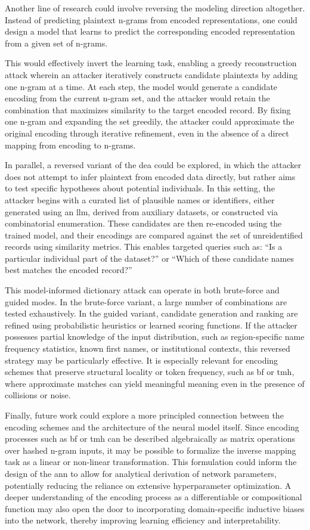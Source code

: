 Another line of research could involve reversing the modeling direction altogether.
Instead of predicting plaintext n-grams from encoded representations, one could design a model that learns to predict the corresponding encoded representation from a given set of n-grams.

This would effectively invert the learning task, enabling a greedy reconstruction attack wherein an attacker iteratively constructs candidate plaintexts by adding one n-gram at a time.
At each step, the model would generate a candidate encoding from the current n-gram set, and the attacker would retain the combination that maximizes similarity to the target encoded record.
By fixing one n-gram and expanding the set greedily, the attacker could approximate the original encoding through iterative refinement, even in the absence of a direct mapping from encoding to n-grams.

In parallel, a reversed variant of the \ac{dea} could be explored, in which the attacker does not attempt to infer plaintext from encoded data directly, but rather aims to test specific hypotheses about potential individuals.
In this setting, the attacker begins with a curated list of plausible names or identifiers, either generated using an \ac{llm}, derived from auxiliary datasets, or constructed via combinatorial enumeration.
These candidates are then re-encoded using the trained model, and their encodings are compared against the set of unreidentified records using similarity metrics.
This enables targeted queries such as: ``Is a particular individual part of the dataset?'' or ``Which of these candidate names best matches the encoded record?''

This model-informed dictionary attack can operate in both brute-force and guided modes.
In the brute-force variant, a large number of combinations are tested exhaustively.
In the guided variant, candidate generation and ranking are refined using probabilistic heuristics or learned scoring functions.
If the attacker possesses partial knowledge of the input distribution, such as region-specific name frequency statistics, known first names, or institutional contexts, this reversed strategy may be particularly effective.
It is especially relevant for encoding schemes that preserve structural locality or token frequency, such as \ac{bf} or \ac{tmh}, where approximate matches can yield meaningful meaning even in the presence of collisions or noise.


Finally, future work could explore a more principled connection between the encoding schemes and the architecture of the neural model itself.
Since encoding processes such as \ac{bf} or \ac{tmh} can be described algebraically as matrix operations over hashed n-gram inputs, it may be possible to formalize the inverse mapping task as a linear or non-linear transformation.
This formulation could inform the design of the \ac{ann} to allow for analytical derivation of network parameters, potentially reducing the reliance on extensive hyperparameter optimization.
A deeper understanding of the encoding process as a differentiable or compositional function may also open the door to incorporating domain-specific inductive biases into the network, thereby improving learning efficiency and interpretability.

